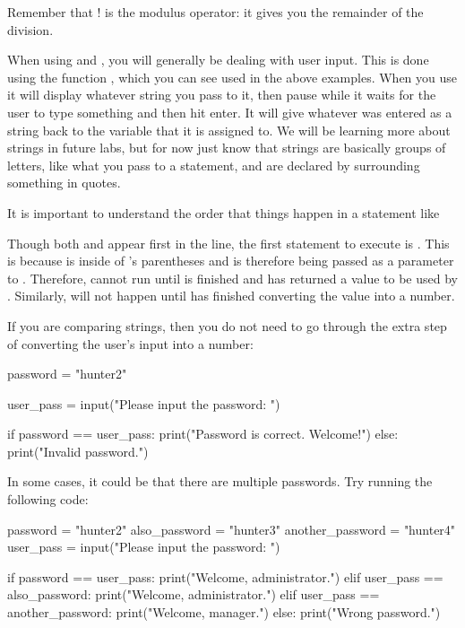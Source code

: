 \documentclass[11pt]{cselabheader}
\begin{document}
Remember that \pythoninline!%
is the modulus operator: it gives you the remainder of the division.

When using  and , you will generally be
dealing with user input. This is done using the function ,
which you can see used in the above examples. When you use
 it will display whatever string you pass to it, then
pause while it waits for the user to type something and then hit enter. It will
give whatever was entered as a string back to the variable that it is assigned
to. We will be learning more about strings in future labs, but for now just know
that strings are basically groups of letters, like what you pass to a
 statement, and are declared by surrounding something in
quotes.

It is important to understand the order that things happen in a statement like


Though both  and  appear first in the line, the
first statement to execute is . This is because
 is inside of 's parentheses and is therefore
being passed as a parameter to . Therefore, 
cannot run until  is finished and has returned a value to be
used by . Similarly,  will not happen until
 has finished converting the value into a number.

If you are comparing strings, then you do not need to go through the extra step
of converting the user's input into a number:

\begin{python3code}
password = "hunter2"

user_pass = input("Please input the password: ")

if password == user_pass:
    print("Password is correct. Welcome!")
else:
    print("Invalid password.")
\end{python3code}

In some cases, it could be that there are multiple passwords. Try running the
following code:

\begin{python3code}
password = "hunter2"
also_password = "hunter3"
another_password = "hunter4"
user_pass = input("Please input the password: ")

if password == user_pass:
    print("Welcome, administrator.")
elif user_pass == also_password:
    print("Welcome, administrator.")
elif user_pass == another_password:
    print("Welcome, manager.")
else:
    print("Wrong password.")
\end{python3code}
\end{document}
